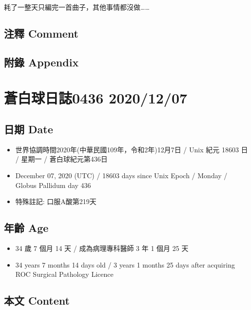 \documentclass[a5paper, 11pt
]{book}
\providecommand{\tightlist}{%
  \setlength{\itemsep}{0pt}\setlength{\parskip}{0pt}}
\begin{document}
耗了一整天只編完一首曲子，其他事情都沒做\ldots\ldots{}

\hypertarget{ux6ce8ux91cb-comment-5}{%
\subsection{注釋 Comment}\label{ux6ce8ux91cb-comment-5}}

\hypertarget{ux9644ux9304-appendix-5}{%
\subsection{附錄 Appendix}\label{ux9644ux9304-appendix-5}}

\hypertarget{ux84bcux767dux7403ux65e5ux8a8c0436-20201207}{%
\section{蒼白球日誌0436
2020/12/07}\label{ux84bcux767dux7403ux65e5ux8a8c0436-20201207}}

\hypertarget{ux65e5ux671f-date-6}{%
\subsection{日期 Date}\label{ux65e5ux671f-date-6}}

\begin{itemize}
\tightlist
\item
  世界協調時間2020年(中華民國109年，令和2年)12月7日 / Unix 紀元 18603 日
  / 星期一 / 蒼白球紀元第436日
\item
  December 07, 2020 (UTC) / 18603 days since Unix Epoch / Monday /
  Globus Pallidum day 436
\item
  特殊註記: 口服A酸第219天
\end{itemize}

\hypertarget{ux5e74ux9f61-age-6}{%
\subsection{年齡 Age}\label{ux5e74ux9f61-age-6}}

\begin{itemize}
\tightlist
\item
  34 歲 7 個月 14 天 / 成為病理專科醫師 3 年 1 個月 25 天
\item
  34 years 7 months 14 days old / 3 years 1 months 25 days after
  acquiring ROC Surgical Pathology Licence
\end{itemize}

\hypertarget{ux672cux6587-content-6}{%
\subsection{本文 Content}\label{ux672cux6587-content-6}}
\end{document}
